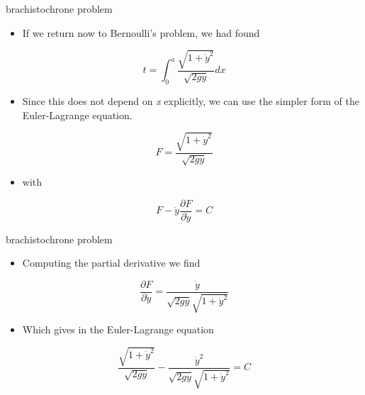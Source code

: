 \documentclass[
  letterpaper,
  ignorenonframetext,
  aspectratio=43,
  handout,
  12pt]{beamer}
\providecommand{\tightlist}{%
  \setlength{\itemsep}{0pt}\setlength{\parskip}{0pt}}
\providecommand{\tightlist}{%
\setlength{\itemsep}{0pt}\setlength{\parskip}{0pt}}
\begin{document}
\begin{frame}{brachistochrone problem}
\protect\hypertarget{brachistochrone-problem}{}
\begin{itemize}
\tightlist
\item
  If we return now to Bernoulli's problem, we had found
\end{itemize}

\[t = \int_0^a \frac{\sqrt{1 + \dot{y}^2}}{\sqrt{2 g y}}dx\]

\begin{itemize}
\tightlist
\item
  Since this does not depend on \emph{x} explicitly, we can use the
  simpler form of the Euler-Lagrange equation.
\end{itemize}

\[F = \frac{\sqrt{1 + \dot{y}^2}}{\sqrt{2 g y}}\]

\begin{itemize}
\tightlist
\item
  with
\end{itemize}

\[F - \dot{y} \frac{\partial F}{\partial \dot{y}} = C\]
\end{frame}

\begin{frame}{brachistochrone problem}
\protect\hypertarget{brachistochrone-problem-1}{}
\begin{itemize}
\tightlist
\item
  Computing the partial derivative we find
\end{itemize}

\[\frac{\partial F}{\partial \dot{y}} = \frac{\dot{y}}{\sqrt{2 g y}\sqrt{1 + \dot{y}^2}}\]

\begin{itemize}
\tightlist
\item
  Which gives in the Euler-Lagrange equation
\end{itemize}

\[\frac{\sqrt{1 + \dot{y}^2}}{\sqrt{2 g y}} - \frac{\dot{y}^2}{\sqrt{2 g y}\sqrt{1 + \dot{y}^2}} = C\]
\end{frame}
\end{document}
